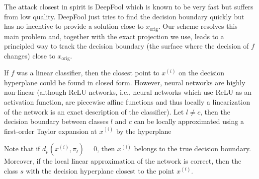 The attack closest in spirit is DeepFool which is known to be very fast but suffers from low quality. DeepFool just tries to find the decision boundary quickly but has no incentive to provide a solution close to $x_{\text{orig}}$. Our scheme resolves this main problem and, together with the exact projection we use, leads to a principled way to track the decision boundary (the surface where the decision of $f$ changes) close to $x_{\text{orig}}$.

If $f$ was a linear classifier, then the closest point to $x^{(i)}$ on the decision hyperplane could be found in closed form. However, neural networks are highly non-linear (although ReLU networks, i.e., neural networks which use ReLU as an activation function, are piecewise affine functions and thus locally a linearization of the network is an exact description of the classifier). Let $l \neq c$, then the decision boundary between classes $l$ and $c$ can be locally approximated using a first-order Taylor expansion at $x^{(i)}$ by the hyperplane

Note that if $d_p(x^{(i)}, \pi_l) = 0$, then $x^{(i)}$ belongs to the true decision boundary. Moreover, if the local linear approximation of the network is correct, then the class $s$ with the decision hyperplane closest to the point $x^{(i)}$.
